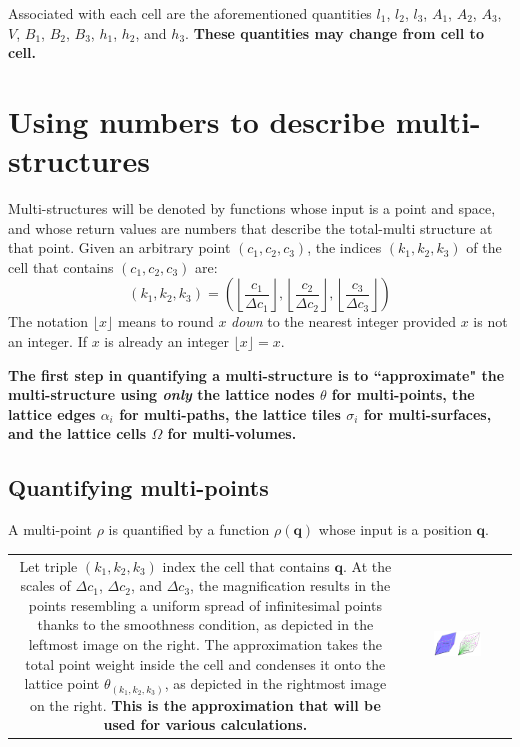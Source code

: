 Associated with each cell are the aforementioned quantities \(l_1\), \(l_2\), \(l_3\), \(A_1\), \(A_2\), \(A_3\), \(V\), \(B_1\), \(B_2\), \(B_3\), \(h_1\), \(h_2\), and \(h_3\). {\bf These quantities may change from cell to cell.}




\section{Using numbers to describe multi-structures}

Multi-structures will be denoted by functions whose input is a point and space, and whose return values are numbers that describe the total-multi structure at that point. Given an arbitrary point \((c_1, c_2, c_3)\), the indices \((k_1, k_2, k_3)\) of the cell that contains \((c_1, c_2, c_3)\) are:
\[(k_1, k_2, k_3) = \left(\left\lfloor\frac{c_1}{\Delta c_1}\right\rfloor, \left\lfloor\frac{c_2}{\Delta c_2}\right\rfloor, \left\lfloor\frac{c_3}{\Delta c_3}\right\rfloor\right)\] 
The notation \(\lfloor x \rfloor\) means to round \(x\) \emph{down} to the nearest integer provided \(x\) is not an integer. If \(x\) is already an integer \(\lfloor x \rfloor = x\). 

{\bf The first step in quantifying a multi-structure is to ``approximate" the multi-structure using \emph{only} the lattice nodes \(\theta\) for multi-points, the lattice edges \(\alpha_i\) for multi-paths, the lattice tiles \(\sigma_i\) for multi-surfaces, and the lattice cells \(\Omega\) for multi-volumes.} 


\subsection{Quantifying multi-points}

A multi-point \(\rho\) is quantified by a function \(\rho(\mathbf{q})\) whose input is a position \(\mathbf{q}\). 

\begin{tabular}{cc}
\parbox{0.5\textwidth}{
Let triple \((k_1, k_2, k_3)\) index the cell that contains \(\mathbf{q}\). At the scales of \(\Delta c_1\), \(\Delta c_2\), and \(\Delta c_3\), the magnification results in the points resembling a uniform spread of infinitesimal points thanks to the smoothness condition, as depicted in the leftmost image on the right. The approximation takes the total point weight inside the cell and condenses it onto the lattice point \(\theta_{(k_1,k_2,k_3)}\), as depicted in the rightmost image on the right. {\bf This is the approximation that will be used for various calculations.}
} & \parbox{0.5\textwidth}{
\includegraphics[width = 0.5\textwidth]{Coordinate_systems/point_density}
}
\end{tabular}


